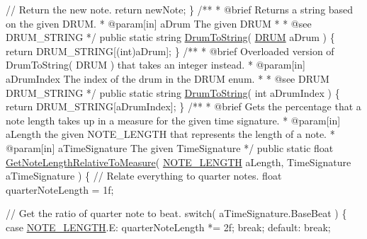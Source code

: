 \begin{DoxyCodeInclude}
        \textcolor{comment}{// Return the new note.}
        \textcolor{keywordflow}{return} newNote;
    \}
\textcolor{comment}{}
\textcolor{comment}{    /**}
\textcolor{comment}{     * @brief Returns a string based on the given DRUM.}
\textcolor{comment}{     * @param[in] aDrum The given DRUM}
\textcolor{comment}{     * }
\textcolor{comment}{     * @see DRUM\_STRING}
\textcolor{comment}{    */}
    \textcolor{keyword}{public} \textcolor{keyword}{static} \textcolor{keywordtype}{string} \hyperlink{group___music_stat_func_gaf5f64ebe9a7e036e07f283e41f26d22b}{DrumToString}( \hyperlink{group___music_enums_gade475b4382c7066d1af13e7c13c029b6}{DRUM} aDrum )
    \{
        \textcolor{keywordflow}{return} DRUM\_STRING[(int)aDrum];
    \}
\textcolor{comment}{}
\textcolor{comment}{    /**}
\textcolor{comment}{     * @brief Overloaded version of DrumToString( DRUM ) that takes an integer instead.}
\textcolor{comment}{     * @param[in] aDrumIndex The index of the drum in the DRUM enum.}
\textcolor{comment}{     * }
\textcolor{comment}{     * @see DRUM DRUM\_STRING}
\textcolor{comment}{    */}
    \textcolor{keyword}{public} \textcolor{keyword}{static} \textcolor{keywordtype}{string} \hyperlink{group___music_stat_func_gaf5f64ebe9a7e036e07f283e41f26d22b}{DrumToString}( \textcolor{keywordtype}{int} aDrumIndex )
    \{
        \textcolor{keywordflow}{return} DRUM\_STRING[aDrumIndex];
    \}
\textcolor{comment}{}
\textcolor{comment}{    /**}
\textcolor{comment}{     * @brief Gets the percentage that a note length takes up in a measure for the given time signature.}
\textcolor{comment}{     * @param[in] aLength the given NOTE\_LENGTH that represents the length of a note.}
\textcolor{comment}{     * @param[in] aTimeSignature The given TimeSignature}
\textcolor{comment}{    */}
    \textcolor{keyword}{public} \textcolor{keyword}{static} \textcolor{keywordtype}{float} \hyperlink{group___music_stat_func_ga91e290b48ad2289493ba4421308abe49}{GetNoteLengthRelativeToMeasure}( 
      \hyperlink{group___music_enums_gaf11b5f079adbb21c800b9eca1c5c3cbd}{NOTE\_LENGTH} aLength, TimeSignature aTimeSignature )
    \{
        \textcolor{comment}{// Relate everything to quarter notes.}
        \textcolor{keywordtype}{float} quarterNoteLength = 1f;

        \textcolor{comment}{// Get the ratio of quarter note to beat.}
        \textcolor{keywordflow}{switch}( aTimeSignature.BaseBeat )
        \{
            \textcolor{keywordflow}{case} \hyperlink{group___music_enums_gaf11b5f079adbb21c800b9eca1c5c3cbd}{NOTE\_LENGTH}.E:
                quarterNoteLength *= 2f;
                \textcolor{keywordflow}{break};
            \textcolor{keywordflow}{default}:
                \textcolor{keywordflow}{break};


\end{DoxyCodeInclude}
